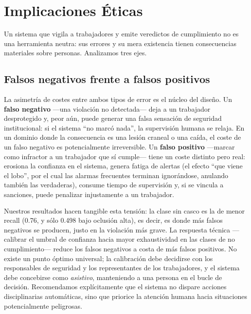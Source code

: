 \documentclass{article}
\begin{document}
\section{Implicaciones Éticas}
\label{sec:ethics}

Un sistema que vigila a trabajadores y emite veredictos de cumplimiento no es
una herramienta neutra: sus errores y su mera existencia tienen consecuencias
materiales sobre personas. Analizamos tres ejes.

\subsection{Falsos negativos frente a falsos positivos}
La asimetría de costes entre ambos tipos de error es el núcleo del diseño. Un
\textbf{falso negativo} —una violación no detectada— deja a un trabajador
desprotegido y, peor aún, puede generar una falsa sensación de seguridad
institucional: si el sistema ``no marcó nada'', la supervisión humana se relaja.
En un dominio donde la consecuencia es una lesión craneal o una caída, el coste
de un falso negativo es potencialmente irreversible. Un \textbf{falso positivo}
—marcar como infractor a un trabajador que sí cumple— tiene un coste distinto
pero real: erosiona la confianza en el sistema, genera fatiga de alertas (el
efecto ``que viene el lobo'', por el cual las alarmas frecuentes terminan
ignorándose, anulando también las verdaderas), consume tiempo de supervisión y,
si se vincula a sanciones, puede penalizar injustamente a un trabajador.

Nuestros resultados hacen tangible esta tensión: la clase \textsf{sin casco} es
la de menor recall (0.76, y sólo 0.498 bajo oclusión alta), es decir, es donde
más falsos negativos se producen, justo en la violación más grave. La respuesta
técnica —calibrar el umbral de confianza hacia mayor exhaustividad en las clases
de no cumplimiento— reduce los falsos negativos a costa de más falsos positivos.
No existe un punto óptimo universal; la calibración debe decidirse con los
responsables de seguridad y los representantes de los trabajadores, y el sistema
debe concebirse como \emph{asistivo}, manteniendo a una persona en el bucle de
decisión. Recomendamos explícitamente que el sistema no dispare acciones
disciplinarias automáticas, sino que priorice la atención humana hacia
situaciones potencialmente peligrosas.
\end{document}
